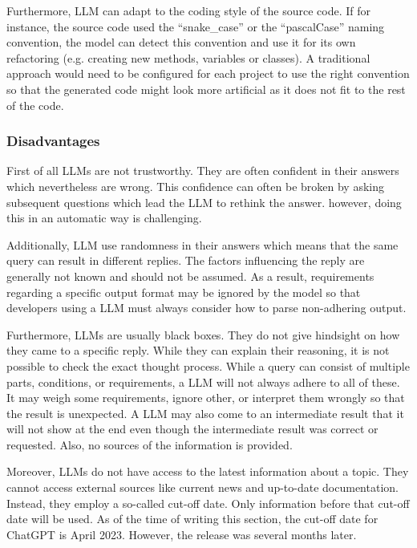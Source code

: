 Furthermore, \ac{LLM} can adapt to the coding style of the source code. If for instance, the source code used the \enquote{snake\_case} or the \enquote{pascalCase} naming convention, the model can detect this convention and use it for its own refactoring (e.g. creating new methods, variables or classes). A traditional approach would need to be configured for each project to use the right convention so that the generated code might look more artificial as it does not fit to the rest of the code.


\subsubsection{Disadvantages}

First of all \ac{LLM}s are not trustworthy. They are often confident in their answers which nevertheless are wrong. This confidence can often be broken by asking subsequent questions which lead the \ac{LLM} to rethink the answer. however, doing this in an automatic way is challenging. \cite{azaria2023internal}

Additionally, \ac{LLM} use randomness in their answers which means that the same query can result in different replies. The factors influencing the reply are generally not known and should not be assumed. As a result, requirements regarding a specific output format may be ignored by the model so that developers using a \ac{LLM} must always consider how to parse non-adhering output.  \cite{hu2023large}

Furthermore, \ac{LLM}s are usually black boxes. They do not give hindsight on how they came to a specific reply. While they can explain their reasoning, it is not possible to check the exact thought process.
While a query can consist of multiple parts, conditions, or requirements, a \ac{LLM} will not always adhere to all of these. It may weigh some requirements, ignore other, or interpret them wrongly so that the result is unexpected. A \ac{LLM} may also come to an intermediate result that it will not show at the end even though the intermediate result was correct or requested. Also, no sources of the information is provided. \cite{chen2023instructzero}

Moreover, \ac{LLM}s do not have access to the latest information about a topic. They cannot access external sources like current news and up-to-date documentation. Instead, they employ a so-called cut-off date. Only information before that cut-off date will be used. As of the time of writing this section, the cut-off date for ChatGPT is April  2023. However, the release was several months later.  

